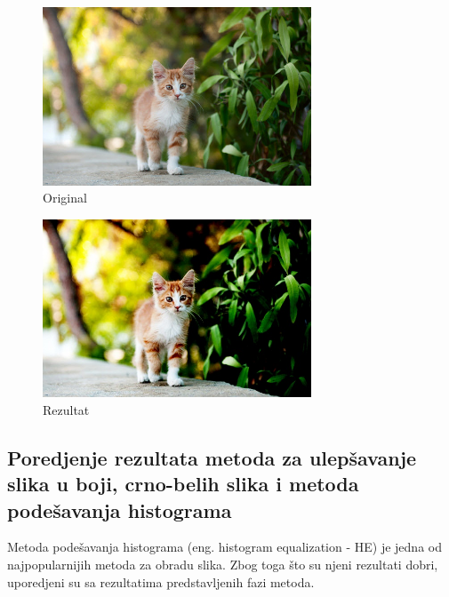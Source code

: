 \documentclass[12pt,a4paper]{article}
\theoremstyle{definition}
\theoremstyle{remark}
\theoremstyle{plain}
\begin{document}
\begin{multicols}{2}
\begin{figure}[H]
\centering
\includegraphics[width=8cm]{images/cat.jpg}
  \caption{Original}\label{river}
\end{figure}
\columnbreak
\begin{figure}[H]
\centering
\includegraphics[width=8cm]{images/fuzzy_color_5.jpg}
  \caption{Rezultat}\label{cat_output}
\end{figure}
\end{multicols}

\newpage
\subsection{Poredjenje rezultata metoda za ulep\v savanje slika u boji, crno-belih slika i metoda pode\v savanja histograma}
Metoda pode\v savanja histograma (eng. histogram equalization - HE) je jedna od najpopularnijih metoda za obradu slika. 
Zbog toga \v sto su njeni rezultati dobri, uporedjeni su sa rezultatima predstavljenih fazi metoda. \\  
\end{document}
